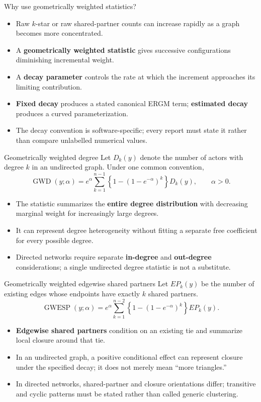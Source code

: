 \documentclass[aspectratio=169,11pt]{beamer}
\newcommand{\term}[1]{\textbf{\color{nupurple}#1}}
\begin{document}
\begin{frame}{Why use geometrically weighted statistics?}
\begin{itemize}
\item Raw $k$-star or raw shared-partner counts can increase rapidly as a graph becomes more concentrated.
\item A \term{geometrically weighted statistic} gives successive configurations diminishing incremental weight.
\item A \term{decay parameter} controls the rate at which the increment approaches its limiting contribution.
\item \term{Fixed decay} produces a stated canonical ERGM term; \term{estimated decay} produces a curved parameterization.
\item The decay convention is software-specific; every report must state it rather than compare unlabelled numerical values.
\end{itemize}
\end{frame}

\begin{frame}{Geometrically weighted degree}
Let $D_k(y)$ denote the number of actors with degree $k$ in an undirected graph. Under one common convention,
\[
\operatorname{GWD}(y;\alpha)=e^{\alpha}\sum_{k=1}^{n-1}\left\{1-(1-e^{-\alpha})^k\right\}D_k(y), \qquad \alpha>0.
\]
\begin{itemize}
\item The statistic summarizes the \term{entire degree distribution} with decreasing marginal weight for increasingly large degrees.
\item It can represent degree heterogeneity without fitting a separate free coefficient for every possible degree.
\item Directed networks require separate \term{in-degree} and \term{out-degree} considerations; a single undirected degree statistic is not a substitute.
\end{itemize}
\end{frame}

\begin{frame}{Geometrically weighted edgewise shared partners}
Let $EP_k(y)$ be the number of existing edges whose endpoints have exactly $k$ shared partners.
\[
\operatorname{GWESP}(y;\alpha)=e^{\alpha}\sum_{k=1}^{n-2}\left\{1-(1-e^{-\alpha})^k\right\}EP_k(y).
\]
\begin{itemize}
\item \term{Edgewise shared partners} condition on an existing tie and summarize local closure around that tie.
\item In an undirected graph, a positive conditional effect can represent closure under the specified decay; it does not merely mean ``more triangles.''
\item In directed networks, shared-partner and closure orientations differ; transitive and cyclic patterns must be stated rather than called generic clustering.
\end{itemize}
\end{frame}
\end{document}
